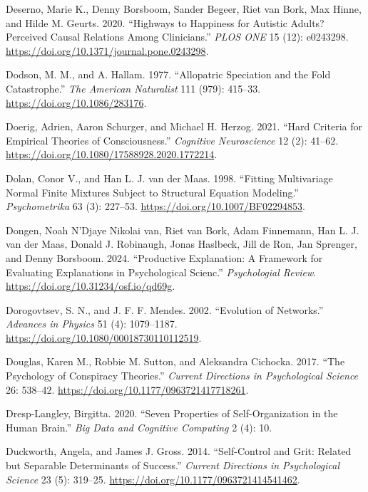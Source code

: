 \documentclass[
  a4paper,
  DIV=11,
  numbers=noendperiod,
  oneside]{scrreprt}
\newlength{\cslhangindent}
\newenvironment{CSLReferences}[2] %
 {\begin{list}{}{%
  \setlength{\itemindent}{0pt}
  \setlength{\leftmargin}{0pt}
  \setlength{\parsep}{0pt}
  \ifodd #1
   \setlength{\leftmargin}{\cslhangindent}
   \setlength{\itemindent}{-1\cslhangindent}
  \fi
  \setlength{\itemsep}{#2\baselineskip}}}
 {\end{list}}
\begin{document}
\begin{CSLReferences}{1}{0}
Deserno, Marie K., Denny Borsboom, Sander Begeer, Riet van Bork, Max
Hinne, and Hilde M. Geurts. 2020. {``Highways to Happiness for Autistic
Adults? {Perceived} Causal Relations Among Clinicians.''} \emph{PLOS
ONE} 15 (12): e0243298.
\url{https://doi.org/10.1371/journal.pone.0243298}.

Dodson, M. M., and A. Hallam. 1977. {``Allopatric {Speciation} and the
{Fold Catastrophe}.''} \emph{The American Naturalist} 111 (979):
415--33. \url{https://doi.org/10.1086/283176}.

Doerig, Adrien, Aaron Schurger, and Michael H. Herzog. 2021. {``Hard
Criteria for Empirical Theories of Consciousness.''} \emph{Cognitive
Neuroscience} 12 (2): 41--62.
\url{https://doi.org/10.1080/17588928.2020.1772214}.

Dolan, Conor V., and Han L. J. van der Maas. 1998. {``Fitting
Multivariage Normal Finite Mixtures Subject to Structural Equation
Modeling.''} \emph{Psychometrika} 63 (3): 227--53.
\url{https://doi.org/10.1007/BF02294853}.

Dongen, Noah N'Djaye Nikolai van, Riet van Bork, Adam Finnemann, Han L.
J. van der Maas, Donald J. Robinaugh, Jonas Haslbeck, Jill de Ron, Jan
Sprenger, and Denny Borsboom. 2024. {``Productive Explanation: A
Framework for Evaluating Explanations in Psychological Scienc.''}
\emph{Psychologial Review}. \url{https://doi.org/10.31234/osf.io/qd69g}.

Dorogovtsev, S. N., and J. F. F. Mendes. 2002. {``Evolution of
Networks.''} \emph{Advances in Physics} 51 (4): 1079--1187.
\url{https://doi.org/10.1080/00018730110112519}.

Douglas, Karen M., Robbie M. Sutton, and Aleksandra Cichocka. 2017.
{``The Psychology of Conspiracy Theories.''} \emph{Current Directions in
Psychological Science} 26: 538--42.
\url{https://doi.org/10.1177/0963721417718261}.

Dresp-Langley, Birgitta. 2020. {``Seven {Properties} of
{Self-Organization} in the {Human Brain}.''} \emph{Big Data and
Cognitive Computing} 2 (4): 10.

Duckworth, Angela, and James J. Gross. 2014. {``Self-Control and Grit:
Related but Separable Determinants of Success.''} \emph{Current
Directions in Psychological Science} 23 (5): 319--25.
\url{https://doi.org/10.1177/0963721414541462}.


\end{CSLReferences}
\end{document}
